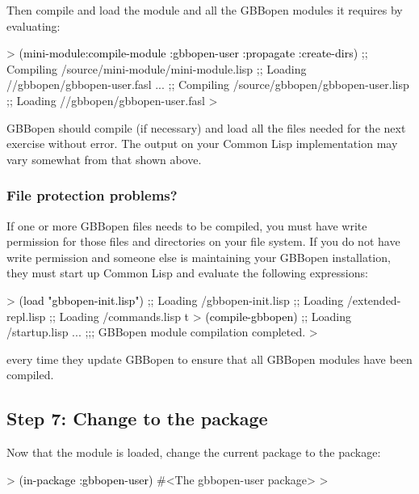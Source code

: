 \documentclass[10pt,twoside,english,pdftex]{article}
\begin{document}
%
Then compile and load the  module and all the
GBBopen modules it requires by evaluating:
%
\begin{example}\color{darkergray}%
  > \textcolor{black}{(mini-module:compile-module :gbbopen-user :propagate :create-dirs)}
  ;; Compiling /source/mini-module/mini-module.lisp
  ;; Loading //gbbopen/gbbopen-user.fasl
       ...
  ;; Compiling /source/gbbopen/gbbopen-user.lisp
  ;; Loading //gbbopen/gbbopen-user.fasl
  >
\end{example}

GBBopen should compile (if necessary) and load all the files needed for the
next exercise without error.  The output on your Common Lisp implementation
may vary somewhat from that shown above.

\subsubsection*{File protection problems?}

%
If one or more GBBopen files needs to be compiled, you must have write
permission for those files and directories on your file system.  If you do not
have write permission and someone else is maintaining your GBBopen
installation, they must start up Common Lisp and evaluate the following
expressions:
%
\begin{example}\color{darkergray}%
  > \textcolor{black}{(load "gbbopen-init.lisp")}
  ;; Loading /gbbopen-init.lisp
  ;;  Loading /extended-repl.lisp
  ;;  Loading /commands.lisp
  t
  > \textcolor{black}{(compile-gbbopen)}
  ;; Loading /startup.lisp
     ...
  ;;; GBBopen module compilation completed.
  >
\end{example}
%
every time they update GBBopen to ensure that all GBBopen modules have
been compiled.

\subsection*{Step 7: Change to the  package}

%
Now that the  module is loaded, change the current
package to the  package:
%
\begin{example}\color{darkergray}%
  > \textcolor{black}{(in-package :gbbopen-user)}
  #<The gbbopen-user package>
  >
\end{example}
\end{document}
